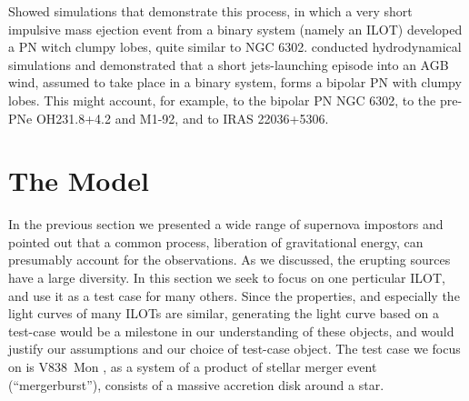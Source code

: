 \documentclass[a4paper,modern]{aastex62}
\begin{document}
\begin{itemize}
\begin{itemize}
\cite{2013MNRAS.436.1961A} Showed simulations that  demonstrate this process, in which a very short impulsive mass ejection event from a binary system (namely an ILOT) developed a PN witch clumpy lobes, quite similar to NGC 6302.
\cite{2013MNRAS.436.1961A} conducted hydrodynamical simulations and demonstrated that a short jets-launching episode into an AGB wind, assumed to take place in a binary system, forms a bipolar PN with clumpy lobes. 
This might account, for example, to the bipolar PN NGC 6302, to the pre-PNe OH231.8+4.2 and M1-92, and to IRAS 22036+5306.

\end{itemize}

\end{itemize}

\section{The Model}

In the previous section we presented a wide range of supernova impostors and pointed out that a common process, liberation of gravitational energy, can presumably account for the observations.
As we discussed, the erupting sources have a large diversity.
In this section we seek to focus on one perticular ILOT, and use it as a test case for many others.
Since the properties, and especially the light curves of many ILOTs are similar, generating the light curve based on a test-case would be a milestone in our understanding of these objects, and would justify our assumptions and our choice of test-case object.
The test case we focus on is V838~Mon \citep{2005A&A...436.1009T,2006A&A...451..223T}, as a system of a product of stellar merger event (``mergerburst''), consists of a massive accretion disk around a star.
\end{document}
